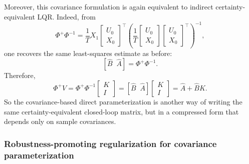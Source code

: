 Moreover, this covariance formulation is again equivalent to indirect certainty-equivalent LQR.
Indeed, from
\[
\Phi^+ \Phi^{-1}
=
\frac{1}{T}
X_1
\begin{bmatrix}
U_0\\[0.3em]
X_0
\end{bmatrix}^\top
\left(
\frac{1}{T}
\begin{bmatrix}
U_0\\[0.3em]
X_0
\end{bmatrix}
\begin{bmatrix}
U_0\\[0.3em]
X_0
\end{bmatrix}^\top
\right)^{-1},
\]
one recovers the same least-squares estimate as before:
\[
[\hat B\;\;\hat A] = \Phi^+\Phi^{-1}.
\]
Therefore,
\[
\Phi^+V
=
\Phi^+\Phi^{-1}
\begin{bmatrix}
K\\[0.3em]
I
\end{bmatrix}
=
[\hat B\;\;\hat A]
\begin{bmatrix}
K\\[0.3em]
I
\end{bmatrix}
=
\hat A+\hat B K.
\]
So the covariance-based direct parameterization is another way of writing the same
certainty-equivalent closed-loop matrix, but in a compressed form that depends only on sample
covariances.

\subsubsection{Robustness-promoting regularization for covariance parameterization}

